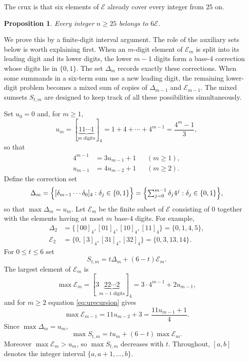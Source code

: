 \documentclass[12pt]{article}
\theoremstyle{plain}
\newtheorem{proposition}[theorem]{Proposition}
\theoremstyle{definition}
\theoremstyle{plain}
\begin{document}
The crux is that six elements of $\mathcal E$ already cover every integer
from $25$ on.

\begin{proposition}\label{prop:E}
Every integer $n\geq25$ belongs to $6\mathcal E$.
\end{proposition}

We prove this by a finite-digit interval argument.  The role of the
auxiliary sets below is worth explaining first.  When an $m$-digit element
of $\mathcal E_{m}$ is split into its leading digit and its lower digits, the
lower $m-1$ digits form a base-$4$ correction whose digits lie in
$\{0,1\}$.  The set $\Delta_m$ records exactly these corrections.  When
some summands in a six-term sum use a new leading digit, the remaining
lower-digit problem becomes a mixed sum of copies of $\Delta_{m-1}$ and
$\mathcal E_{m-1}$.  The mixed sumsets $S_{t,m}$ are designed to keep
track of all these possibilities simultaneously.

Set $u_0=0$ and, for $m\geq1$,
\begin{equation}\label{eq:umdef}
 u_m=[\underbrace{11\cdots1}_{m\text{ digits}}]_4
    =1+4+\cdots+4^{m-1}=\frac{4^m-1}{3},
\end{equation}
so that
\begin{equation}\label{eq:urecursion}
\begin{aligned}
 4^{m-1}&=3u_{m-1}+1 &&(m\geq1),\\
 u_{m-1}&=4u_{m-2}+1 &&(m\geq2).
\end{aligned}
\end{equation}
Define the correction set
\[
 \Delta_m=\Bigl\{[\delta_{m-1}\cdots\delta_0]_4:\delta_j\in\{0,1\}\Bigr\}
    =\Bigl\{\textstyle\sum_{j=0}^{m-1}\delta_j4^j:\delta_j\in\{0,1\}\Bigr\},
\]
so that $\max \Delta_m=u_m$.  Let $\mathcal E_{m}$ be the finite subset of
$\mathcal E$ consisting of $0$ together with the elements having at most
$m$ base-$4$ digits.  For example,
\[
\begin{aligned}
 \Delta_2&=\{[00]_4,[01]_4,[10]_4,[11]_4\}=\{0,1,4,5\},\\
 \mathcal E_2&=\{0,[3]_4,[31]_4,[32]_4\}=\{0,3,13,14\}.
\end{aligned}
\]
For $0\leq t\leq6$ set
\begin{equation}\label{eq:S-t-m}
 S_{t,m}=t\Delta_m+(6-t)\mathcal E_{m}.
\end{equation}
The largest element of $\mathcal E_{m}$ is
\[
 \max\mathcal E_{m}=[3\underbrace{22\cdots2}_{m-1\text{ digits}}]_4
                =3\cdot4^{m-1}+2u_{m-1},
\]
and for $m\geq2$ equation \eqref{eq:urecursion} gives
\begin{equation}\label{eq:maxErecursion}
 \max\mathcal E_{m-1}=11u_{m-2}+3=\frac{11u_{m-1}+1}{4}.
\end{equation}
Since $\max \Delta_m=u_m$,
\begin{equation}\label{eq:maxStm}
 \max S_{t,m}=tu_m+(6-t)\max\mathcal E_{m} .
\end{equation}
Moreover $\max\mathcal E_{m}>u_m$, so $\max S_{t,m}$ decreases with $t$.
Throughout, $[a,b]$ denotes the integer interval $\{a,a+1,\ldots,b\}$.
\end{document}
